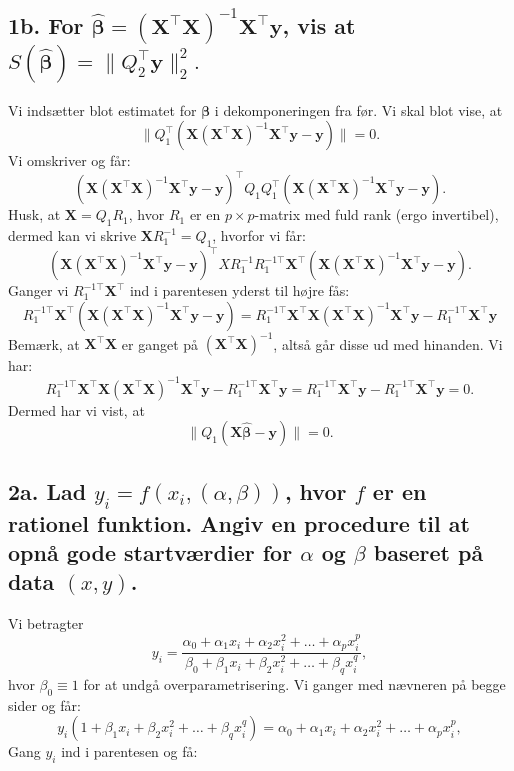 \documentclass[12pt]{report}
\theoremstyle{break}
\theoremstyle{break}
\newcommand{\by}{\mathbf{y}}
\newcommand{\bX}{\mathbf{X}}
\newcommand{\bbeta}{\bm{\beta}}
\newcommand{\norm}[1]{\|#1\|}
\begin{document}
 \subsection*{1b. For $\hat{\bbeta}=(\bX^\top\bX)^{-1}\bX^\top\by$, vis at $S(\hat{\bbeta})=\norm{Q_2^\top\by}_2^2.$}
 Vi indsætter blot estimatet for $\bbeta$ i dekomponeringen fra før. Vi skal blot vise, at \[\norm{Q_1^\top(\bX(\bX^\top\bX)^{-1}\bX^\top\by-\by)}=0.\]
 Vi omskriver og får:
 \[(\bX(\bX^\top\bX)^{-1}\bX^\top\by-\by)^\top Q_1Q_1^\top(\bX(\bX^\top\bX)^{-1}\bX^\top\by-\by).\]
 Husk, at $\bX=Q_1R_1$, hvor $R_1$ er en $p\times p$-matrix med fuld rank (ergo invertibel), dermed kan vi skrive $\bX R_1^{-1} = Q_1$, hvorfor vi får:
  \[(\bX(\bX^\top\bX)^{-1}\bX^\top\by-\by)^\top XR_1^{-1}R_1^{-1\top}\bX^\top(\bX(\bX^\top\bX)^{-1}\bX^\top\by-\by).\]
 Ganger vi $R_1^{-1\top}\bX^\top$ ind i parentesen yderst til højre fås:
 \[R_1^{-1\top}\bX^\top(\bX(\bX^\top\bX)^{-1}\bX^\top\by-\by) = R_1^{-1\top}\bX^\top\bX(\bX^\top\bX)^{-1}\bX^\top\by-R_1^{-1\top}\bX^\top\by\]
 Bemærk, at $\bX^\top\bX$ er ganget på $(\bX^\top\bX)^{-1}$, altså går disse ud med hinanden. Vi har:
 \[R_1^{-1\top}\bX^\top\bX(\bX^\top\bX)^{-1}\bX^\top\by-R_1^{-1\top}\bX^\top\by = R_1^{-1\top}\bX^\top\by-R_1^{-1\top}\bX^\top\by = 0.\]
 Dermed har vi vist, at
 \[\norm{Q_1(\bX\hat{\bbeta}-\by)}=0.\]
 
\clearpage
 
\subsection*{2a. Lad $y_i=f(x_i,(\alpha,\beta))$, hvor $f$ er en rationel funktion. Angiv en procedure til at opnå gode startværdier for $\alpha$ og $\beta$ baseret på data $(x,y)$.}
Vi betragter
\[y_i = \frac{\alpha_0+\alpha_1 x_i+\alpha_2x_i^2 +\ldots+\alpha_p x_i^p}{\beta_0+\beta_1 x_i+\beta_2 x_i^2+\ldots+\beta_q x_i^q},\]
hvor $\beta_0 \equiv 1$ for at undgå overparametrisering.
Vi ganger med nævneren på begge sider og får:
\[y_i(1+\beta_1 x_i+\beta_2 x_i^2+\ldots+\beta_q x_i^q) = \alpha_0+\alpha_1 x_i+\alpha_2x_i^2 +\ldots+\alpha_p x_i^p,\]
 Gang $y_i$ ind i parentesen og få:
 
\end{document}
